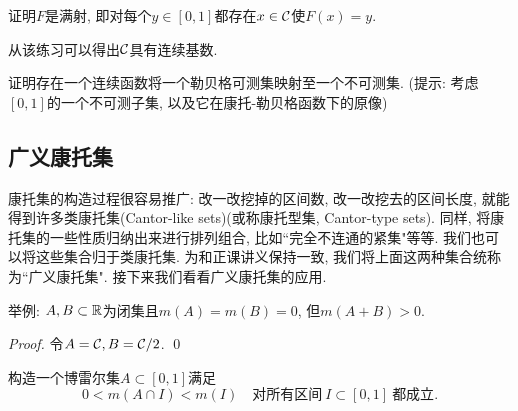 \begin{exercise}
    证明$F$是满射, 即对每个$y \in [0,1]$都存在$x \in \mathcal{C}$使$F(x)=y$.
\end{exercise}
从该练习可以得出$\mathcal{C}$具有连续基数. 

\begin{exercise} %
    证明存在一个连续函数将一个勒贝格可测集映射至一个不可测集. (提示: 考虑$[0,1]$的一个不可测子集, 以及它在康托-勒贝格函数下的原像)
\end{exercise}


\subsection{广义康托集}
康托集的构造过程很容易推广: 改一改挖掉的区间数, 改一改挖去的区间长度, 就能得到许多类康托集(Cantor-like sets)(或称康托型集, Cantor-type sets).
同样, 将康托集的一些性质归纳出来进行排列组合, 比如``完全不连通的紧集"等等. 我们也可以将这些集合归于类康托集. 为和正课讲义保持一致, 我们将上面这两种集合统称为``广义康托集". 接下来我们看看广义康托集的应用. 

\begin{example} %
    举例: $A, B \subset \mathbb{R}$为闭集且$m(A)=m(B)=0$, 但$m(A+B)>0$.
\end{example}
\begin{proof}
    令$A = \mathcal{C}, B = \mathcal{C} / 2$. 
    \qed
\end{proof}


\begin{example}
    构造一个博雷尔集$A \subset [0,1]$满足
    $$ 0<m(A \cap I)<m(I) \quad \text{对所有区间}~I \subset [0,1]~\text{都成立}. $$
\end{example}






